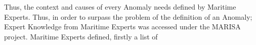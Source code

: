 

Thus, the context and causes of every Anomaly needs defined by Maritime Experts. Thus, in order to surpass the problem of the definition of an Anomaly; Expert Knowledge from Maritime Experts was accessed under the MARISA project. Maritime Experts defined, firstly a list of  




